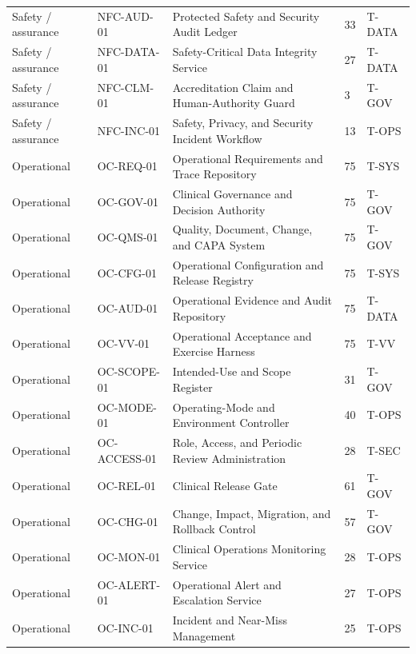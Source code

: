 \documentclass[11pt,letterpaper]{article}
\begin{document}
\begin{scriptsize}
\begin{longtable}{@{}L{0.12\textwidth}L{0.14\textwidth}L{0.44\textwidth}L{0.14\textwidth}L{0.08\textwidth}@{}}
\addlinespace[2pt]
Safety / assurance & NFC-AUD-01 & Protected Safety and Security Audit Ledger & 33 & T-DATA \\
\addlinespace[2pt]
Safety / assurance & NFC-DATA-01 & Safety-Critical Data Integrity Service & 27 & T-DATA \\
\addlinespace[2pt]
Safety / assurance & NFC-CLM-01 & Accreditation Claim and Human-Authority Guard & 3 & T-GOV \\
\addlinespace[2pt]
Safety / assurance & NFC-INC-01 & Safety, Privacy, and Security Incident Workflow & 13 & T-OPS \\
\addlinespace[2pt]
Operational & OC-REQ-01 & Operational Requirements and Trace Repository & 75 & T-SYS \\
\addlinespace[2pt]
Operational & OC-GOV-01 & Clinical Governance and Decision Authority & 75 & T-GOV \\
\addlinespace[2pt]
Operational & OC-QMS-01 & Quality, Document, Change, and CAPA System & 75 & T-GOV \\
\addlinespace[2pt]
Operational & OC-CFG-01 & Operational Configuration and Release Registry & 75 & T-SYS \\
\addlinespace[2pt]
Operational & OC-AUD-01 & Operational Evidence and Audit Repository & 75 & T-DATA \\
\addlinespace[2pt]
Operational & OC-VV-01 & Operational Acceptance and Exercise Harness & 75 & T-VV \\
\addlinespace[2pt]
Operational & OC-SCOPE-01 & Intended-Use and Scope Register & 31 & T-GOV \\
\addlinespace[2pt]
Operational & OC-MODE-01 & Operating-Mode and Environment Controller & 40 & T-OPS \\
\addlinespace[2pt]
Operational & OC-ACCESS-01 & Role, Access, and Periodic Review Administration & 28 & T-SEC \\
\addlinespace[2pt]
Operational & OC-REL-01 & Clinical Release Gate & 61 & T-GOV \\
\addlinespace[2pt]
Operational & OC-CHG-01 & Change, Impact, Migration, and Rollback Control & 57 & T-GOV \\
\addlinespace[2pt]
Operational & OC-MON-01 & Clinical Operations Monitoring Service & 28 & T-OPS \\
\addlinespace[2pt]
Operational & OC-ALERT-01 & Operational Alert and Escalation Service & 27 & T-OPS \\
\addlinespace[2pt]
Operational & OC-INC-01 & Incident and Near-Miss Management & 25 & T-OPS \\

\end{longtable}
\end{scriptsize}
\end{document}
